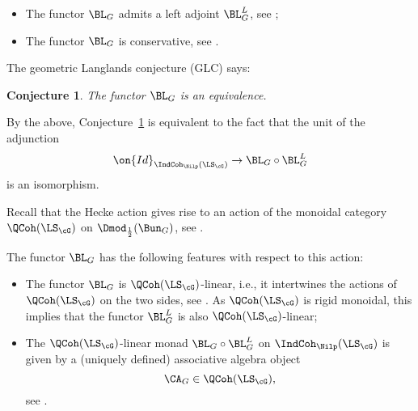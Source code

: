 \documentclass[9pt]{amsart}
\newtheorem{conj}[subsubsection]{Conjecture}
\theoremstyle{remark}
\theoremstyle{definition}
\theoremstyle{remark}
\newcommand{\conjref}[1]{Conjecture~\ref{#1}}
\numberwithin{equation}{section}
\begin{document}
\begin{itemize}

\item The functor $\BL_G$ admits a left adjoint $\BL^L_G$, 
see \cite[Theorem 16.1.2]{GLC3}; 

\item The functor $\BL_G$ is conservative, see \cite[Theorem 1.6.2]{GLC4}. 

\end{itemize}

\sssec{}

The geometric Langlands conjecture (GLC) says:

\begin{conj} \label{c:GLC}
The functor $\BL_G$ is an equivalence. 
\end{conj}

\sssec{}

By the above, \conjref{c:GLC} is equivalent to the fact that the unit of the adjunction
\begin{equation} \label{e:unit initial}
\on{Id}_{\IndCoh_\Nilp(\LS_{\cG})}\to \BL_G\circ \BL^L_G
\end{equation}
is an isomorphism.


\sssec{}

Recall that the Hecke action gives rise to an action of the monoidal category $\QCoh(\LS_\cG)$
on $\Dmod_{\frac{1}{2}}(\Bun_G)$, see \cite[Sect. 1.2]{GLC1}.

\medskip

The functor $\BL_G$ has the following features with respect to this action:

\begin{itemize}

\item The functor $\BL_G$ is $\QCoh(\LS_\cG)$-linear, i.e., it intertwines the actions of $\QCoh(\LS_\cG)$ on the two sides, see
\cite[Sect. 1.7]{GLC1}. As $\QCoh(\LS_\cG)$ is rigid
monoidal, this implies that the functor $\BL_G^L$ is also $\QCoh(\LS_\cG)$-linear; 

\medskip

\item The $\QCoh(\LS_\cG)$-linear monad $\BL_G\circ \BL^L_G$ on $\IndCoh_\Nilp(\LS_{\cG})$
is given by a (uniquely defined) associative algebra object 
$$\CA_G\in \QCoh(\LS_\cG),$$
see \cite[Theorem 16.4.2]{GLC3}.

\end{itemize}
\end{document}
